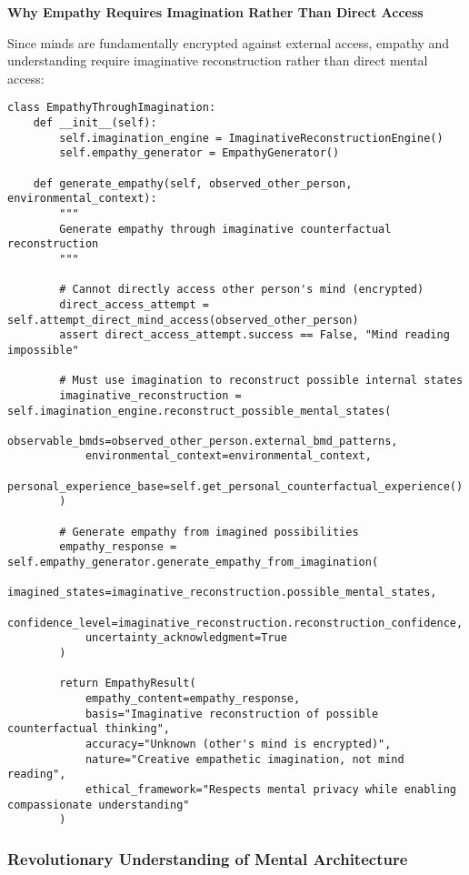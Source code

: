 \documentclass[12pt,a4paper]{article}
\begin{document}
\textbf{Why Empathy Requires Imagination Rather Than Direct Access}

Since minds are fundamentally encrypted against external access, empathy and understanding require imaginative reconstruction rather than direct mental access:

\begin{lstlisting}[style=pythonstyle, caption=Empathy Through Imaginative Reconstruction]
class EmpathyThroughImagination:
    def __init__(self):
        self.imagination_engine = ImaginativeReconstructionEngine()
        self.empathy_generator = EmpathyGenerator()
        
    def generate_empathy(self, observed_other_person, environmental_context):
        """
        Generate empathy through imaginative counterfactual reconstruction
        """
        
        # Cannot directly access other person's mind (encrypted)
        direct_access_attempt = self.attempt_direct_mind_access(observed_other_person)
        assert direct_access_attempt.success == False, "Mind reading impossible"
        
        # Must use imagination to reconstruct possible internal states
        imaginative_reconstruction = self.imagination_engine.reconstruct_possible_mental_states(
            observable_bmds=observed_other_person.external_bmd_patterns,
            environmental_context=environmental_context,
            personal_experience_base=self.get_personal_counterfactual_experience()
        )
        
        # Generate empathy from imagined possibilities
        empathy_response = self.empathy_generator.generate_empathy_from_imagination(
            imagined_states=imaginative_reconstruction.possible_mental_states,
            confidence_level=imaginative_reconstruction.reconstruction_confidence,
            uncertainty_acknowledgment=True
        )
        
        return EmpathyResult(
            empathy_content=empathy_response,
            basis="Imaginative reconstruction of possible counterfactual thinking",
            accuracy="Unknown (other's mind is encrypted)",
            nature="Creative empathetic imagination, not mind reading",
            ethical_framework="Respects mental privacy while enabling compassionate understanding"
        )
\end{lstlisting}

\subsubsection{Revolutionary Understanding of Mental Architecture}
\end{document}
